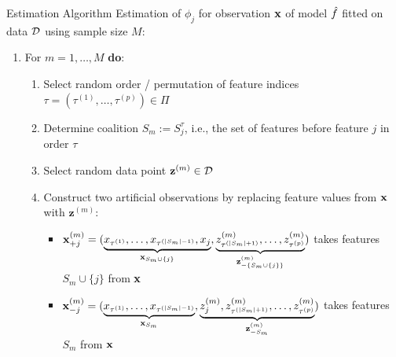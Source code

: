 \documentclass[11pt,compress,t,notes=noshow, aspectratio=169, xcolor=table]{beamer}
\newcommand{\Sm}{S_m}%
\newcommand{\Smj}{\Sm \cup \{j\}}
\newcommand{\minusSmj}{- \{\Sm \cup \{j\} \} }
\newcommand{\Stau}{S_{j}^\tau}%
\newcommand{\xjp}{\xv_{+j}^{(m)}}
\newcommand{\xjm}{\xv_{-j}^{(m)}}
\begin{document}
\begin{frame}{Estimation Algorithm }
Estimation of $\phi_j$ for observation $\xv$ of model $\fh$ fitted on data $\D$ using sample size $M$:
  \begin{enumerate}[<+->]
      \item For $m = 1, \ldots, M$ \textbf{do}:
      \begin{enumerate}
        \item Select random order / permutation of feature indices $\tau = (\tau^{(1)}, \ldots, \tau^{(p)}) \in \Pi$
        \item Determine coalition $\Sm := \Stau$, i.e., the set of features before feature $j$ in order $\tau$
        \item Select random data point $\mathbf{z}^{(m)} \in \D$%
        \item Construct two artificial observations by replacing feature values from $\xv$ with $\mathbf{z}^{(m)}$:
          \begin{itemize}
          \setlength\itemsep{.5em}
            \item %
            $ \xjp  = (\underbrace{x_{\tau^{(1)}}, \ldots, x_{\tau^{(|\Sm|-1)}}, x_{j}}_{\xv_{\Smj}}, \underbrace{z_{\tau^{(|\Sm|+1)}}^{(m)} , \ldots, z_{\tau^{(p)}}^{(m)}}_{\mathbf{z}^{(m)}_{\minusSmj}} )$
            takes features $\Smj$ from $\xv$
            \item %
            $ \xjm = (\underbrace{x_{\tau^{(1)}}, \ldots, x_{\tau^{(|\Sm|-1)}}}_{\xv_{\Sm}}, \underbrace{z_{j}^{(m)} , z_{\tau^{(|\Sm|+1)}}^{(m)} , \ldots, z_{\tau^{(p)}}^{(m)}}_{\mathbf{z}^{(m)}_{-\Sm}} )$
            takes features $\Sm$ from $\xv$

\end{itemize}
\end{enumerate}
\end{enumerate}
\end{frame}
\end{document}
